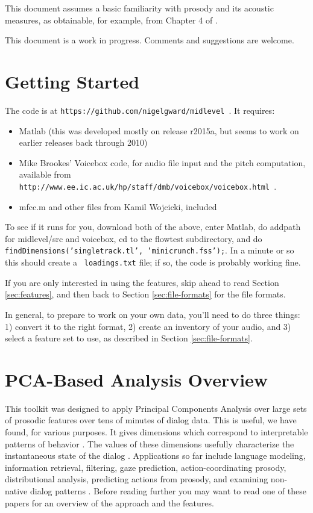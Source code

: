 \documentclass[11pt]{article}
\begin{document}
This document assumes a basic familiarity with prosody and its
acoustic measures, as obtainable, for example, from Chapter 4 of
\cite{ladefoged03}.

This document is a work in progress.  Comments and suggestions are
welcome.


\section{Getting Started}

The code is at {\tt https://github.com/nigelgward/midlevel }.  It requires:
\begin{itemize}\setlength{\itemsep}{0pt}\setlength{\parskip}{0pt}
\item Matlab (this was developed mostly on release r2015a, but seems
  to work on earlier releases back through 2010)
\item Mike Brookes' Voicebox code, for audio file input and the pitch
  computation, available from {\tt
    http://www.ee.ic.ac.uk/hp/staff/dmb/voicebox/voicebox.html }.
\item mfcc.m and other files from Kamil Wojcicki, included 
\end{itemize}

To see if it runs for you, download both of the above, enter Matlab,
do addpath for midlevel/src and voicebox, cd to the flowtest
subdirectory, and do {\tt findDimensions('singletrack.tl',
  'minicrunch.fss');}. In a minute or so this should create a {\tt
  loadings.txt} file; if so, the code is probably working fine.

If you are only interested in using the features, skip ahead to read
Section \ref{sec:features}, and then back to Section
\ref{sec:file-formats} for the file formats.

In general, to prepare to work on your own data, you'll need to do
three things: 1) convert it to the right format, 2) create an
inventory of your audio, and 3) select a feature set to use, as
described in Section \ref{sec:file-formats}.


\section{PCA-Based Analysis Overview }

This toolkit was designed to apply Principal Components Analysis over
large sets of prosodic features over tens of minutes of dialog data.
This is useful, we have found, for various purposes.  It gives
dimensions which correspond to interpretable patterns of behavior
\cite{prosodic-elements}.  The values of these dimensions usefully
characterize the instantaneous state of the dialog
\cite{dialog-dimensions}.  Applications so far include language
modeling, information retrieval, filtering, gaze prediction,
action-coordinating prosody, distributional analysis, predicting
actions from prosody, and examining non-native dialog patterns
\cite{pca-lm,prosody-ir,sigdial-codec,ward-gaze,ward-abu,lala15,dimensions-uh-huh,l2english}.
Before reading further you may want to read one of these papers for an
overview of the approach and the features.
\end{document}
